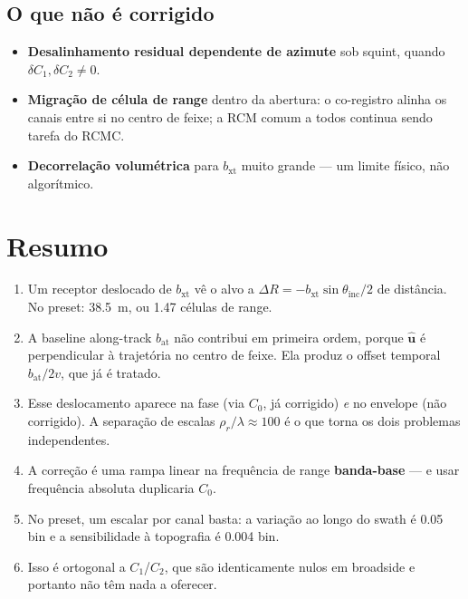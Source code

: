\documentclass[11pt,a4paper]{article}
\newcommand{\bxt}{b_{\mathrm{xt}}}
\newcommand{\bat}{b_{\mathrm{at}}}
\newcommand{\thi}{\theta_{\mathrm{inc}}}
\newcommand{\rhor}{\rho_{r}}
\newcommand{\uhat}{\hat{\bm{u}}}
\begin{document}
\subsection{O que não é corrigido}

\begin{itemize}
\item \textbf{Desalinhamento residual dependente de azimute} sob squint,
quando $\delta C_1, \delta C_2 \neq 0$.
\item \textbf{Migração de célula de range} dentro da abertura: o co-registro
alinha os canais entre si no centro de feixe; a RCM comum a todos continua
sendo tarefa do RCMC.
\item \textbf{Decorrelação volumétrica} para $\bxt$ muito grande --- um
limite físico, não algorítmico.
\end{itemize}

\section{Resumo}

\begin{enumerate}
\item Um receptor deslocado de $\bxt$ vê o alvo a
$\Delta R = -\bxt\sin\thi/2$ de distância. No preset: \SI{38.5}{m}, ou
\num{1.47} células de range.
\item A baseline along-track $\bat$ não contribui em primeira ordem, porque
$\uhat$ é perpendicular à trajetória no centro de feixe. Ela produz o offset
temporal $\bat/2v$, que já é tratado.
\item Esse deslocamento aparece na fase (via $C_0$, já corrigido) \emph{e}
no envelope (não corrigido). A separação de escalas $\rhor/\lambda \approx
100$ é o que torna os dois problemas independentes.
\item A correção é uma rampa linear na frequência de range \textbf{banda-base}
--- e usar frequência absoluta duplicaria $C_0$.
\item No preset, um escalar por canal basta: a variação ao longo do swath é
\num{0.05} bin e a sensibilidade à topografia é \num{0.004} bin.
\item Isso é ortogonal a $C_1$/$C_2$, que são identicamente nulos em
broadside e portanto não têm nada a oferecer.
\end{enumerate}
\end{document}
